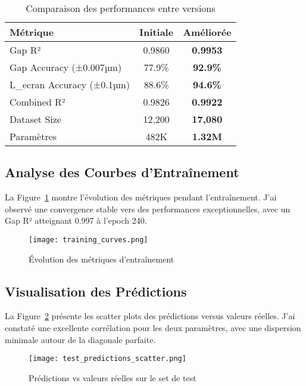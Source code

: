 \documentclass[10pt,twocolumn]{article}
\begin{document}
\begin{table}[H]
\centering
\caption{Comparaison des performances entre versions}
\label{tab:comparison}
\begin{tabular}{|l|c|c|}
\hline
\rowcolor{lightblue}
\textbf{Métrique} & \textbf{Initiale} & \textbf{Améliorée} \\
\hline
\rowcolor{lightgray}
Gap R² & 0.9860 & \textbf{\color{darkblue}0.9953} \\
\hline
Gap Accuracy (±0.007µm) & 77.9\% & \textbf{\color{darkblue}92.9\%} \\
\hline
\rowcolor{lightgray}
L\_ecran Accuracy (±0.1µm) & 88.6\% & \textbf{\color{darkblue}94.6\%} \\
\hline
Combined R² & 0.9826 & \textbf{\color{darkblue}0.9922} \\
\hline
\rowcolor{lightgray}
Dataset Size & 12,200 & \textbf{\color{darkblue}17,080} \\
\hline
Paramètres & 482K & \textbf{\color{darkblue}1.32M} \\
\hline
\end{tabular}
\end{table}

\subsection{Analyse des Courbes d'Entraînement}

La Figure~\ref{fig:training} montre l'évolution des métriques pendant l'entraînement. J'ai observé une convergence stable vers des performances exceptionnelles, avec un Gap R² atteignant 0.997 à l'epoch 240.

\begin{figure}[H]
\centering
\texttt{[image: training\_curves.png]}
\caption{Évolution des métriques d'entraînement}
\label{fig:training}
\end{figure}

\subsection{Visualisation des Prédictions}

La Figure~\ref{fig:scatter} présente les scatter plots des prédictions versus valeurs réelles. J'ai constaté une excellente corrélation pour les deux paramètres, avec une dispersion minimale autour de la diagonale parfaite.

\begin{figure}[H]
\centering
\texttt{[image: test\_predictions\_scatter.png]}
\caption{Prédictions vs valeurs réelles sur le set de test}
\label{fig:scatter}
\end{figure}
\end{document}
